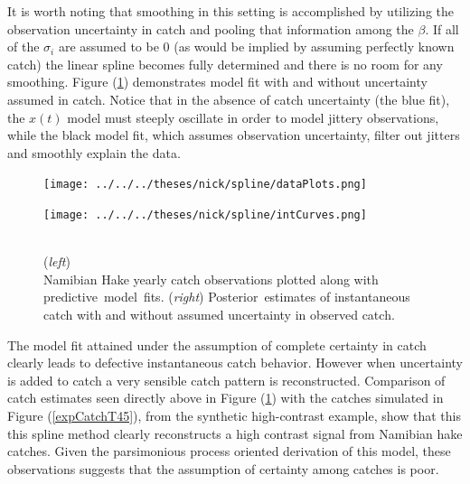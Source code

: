 \documentclass[12pt]{article}
\begin{document}

%
It is worth noting that smoothing in this setting is accomplished by utilizing
the observation uncertainty in catch and pooling that information among the $\beta$.
If all of the $\sigma_i$ are assumed to be $0$ (as would be implied by assuming 
perfectly known catch) the linear spline becomes fully determined and there is 
no room for any smoothing. Figure (\ref{splines}) demonstrates model fit with 
and without uncertainty assumed in catch. Notice that in the absence of catch 
uncertainty (the blue fit), the $x(t)$ model must steeply oscillate 
in order to model jittery observations, while the black model fit, which assumes 
observation uncertainty, filter out jitters and smoothly explain the data. 

%
\vspace{-0.4cm}
\begin{figure}[h!]
\begin{minipage}[h!]{0.36\textwidth}
%
\hspace{-1cm}
\texttt{[image: ../../../theses/nick/spline/dataPlots.png]}%
\end{minipage}
\begin{minipage}[h!]{0.36\textwidth}
\hspace{-0.5cm}
\texttt{[image: ../../../theses/nick/spline/intCurves.png]}%
\end{minipage}
\begin{minipage}[h!]{0.24\textwidth}
\caption{\label{splines}
\\(\emph{left})\\ Namibian Hake yearly catch \mbox{observations} plotted along with \mbox{predictive model fits.} (\emph{right}) \mbox{Posterior estimates} of instantaneous catch with and without assumed \mbox{uncertainty} in observed catch. 
}
\end{minipage}
\end{figure}

%
\vspace{-0.5cm}
The model fit attained under the assumption of complete certainty in catch 
clearly leads to defective instantaneous catch behavior. However when 
uncertainty is added to catch a very sensible catch pattern is reconstructed.
Comparison of catch estimates seen directly above in Figure (\ref{splines}) 
with the catches simulated in Figure (\ref{expCatchT45}), from the synthetic 
high-contrast example, show that this this spline method clearly reconstructs
a high contrast signal from Namibian hake catches. Given the parsimonious 
process oriented derivation of this model, these observations suggests that the 
assumption of certainty among catches is poor.
\end{document}
